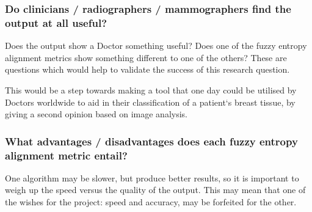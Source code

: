 \subsubsection{Do clinicians / radiographers / mammographers find the output at all useful?}

Does the output show a Doctor something useful? Does one of the fuzzy entropy alignment metrics show something different to one of the others? These are questions which would help to validate the success of this research question.

This would be a step towards making a tool that one day could be utilised by Doctors worldwide to aid in their classification of a patient`s breast tissue, by giving a second opinion based on image analysis.

\subsubsection{What advantages / disadvantages does each fuzzy entropy alignment metric entail?}

One algorithm may be slower, but produce better results, so it is important to weigh up the speed versus the quality of the output. This may mean that one of the wishes for the project: speed and accuracy, may be forfeited for the other.
